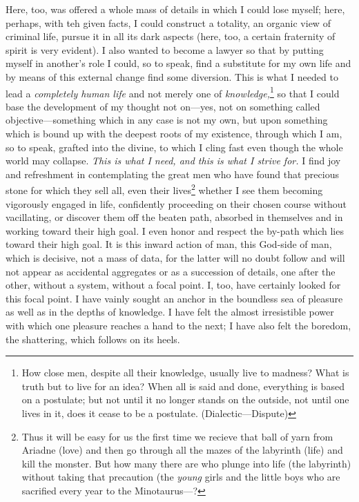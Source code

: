 Here, too, was offered a whole mass of details in which I could lose myself; here, perhaps, with teh given facts, I could construct a totality, an organic view of criminal life, pursue it in all its dark aspects (here, too, a certain fraternity of spirit is very evident). 
 I also wanted to become a lawyer so that by putting myself in another's role I could, so to speak, find a substitute for my own life and by means of this external change find some diversion. 
 This is what I needed to lead a \textit{completely human life} and not merely one of \textit{knowledge,}\footnote{
   How close men, despite all their knowledge, usually live to madness? 
   What is truth but to live for an idea? 
   When all is said and done, everything is based on a postulate; but not until it no longer stands on the outside, not until one lives in it, does it cease to be a postulate. 
   (Dialectic---Dispute) 
 }
   so that I could base the development of my thought not on---yes, not on something called objective---something which in any case is not my own, but upon something which is bound up with the deepest roots of my existence, through which I am, so to speak, grafted into the divine, to which I cling fast even though the whole world may collapse. 
 \textit{This is what I need, and this is what I strive for.} 
 I find joy and refreshment in contemplating the great men who have found that precious stone for which they sell all, even their lives\footnote{
   Thus it will be easy for us the first time we recieve that ball of yarn from Ariadne (love) and then go through all the mazes of the labyrinth (life) and kill the monster. 
   But how many there are who plunge into life (the labyrinth) without taking that precaution (the \textit{young} girls and the little boys who are sacrified every year to the Minotaurus---? 
 }
   whether I see them becoming vigorously engaged in life, confidently proceeding on their chosen course without vacillating, or discover them off the beaten path, absorbed in themselves and in working toward their high goal. 
 I even honor and respect the by-path which lies toward their high goal. 
 It is this inward action of man, this God-side of man, which is decisive, not a mass of data, for the latter will no doubt follow and will not appear as accidental aggregates or as a succession of details, one after the other, without a system, without a focal point. 
 I, too, have certainly looked for this focal point. 
 I have vainly sought an anchor in the boundless sea of pleasure as well as in the depths of knowledge. 
 I have felt the almost irresistible power with which one pleasure reaches a hand to the next; I have also felt the boredom, the shattering, which follows on its heels. 
